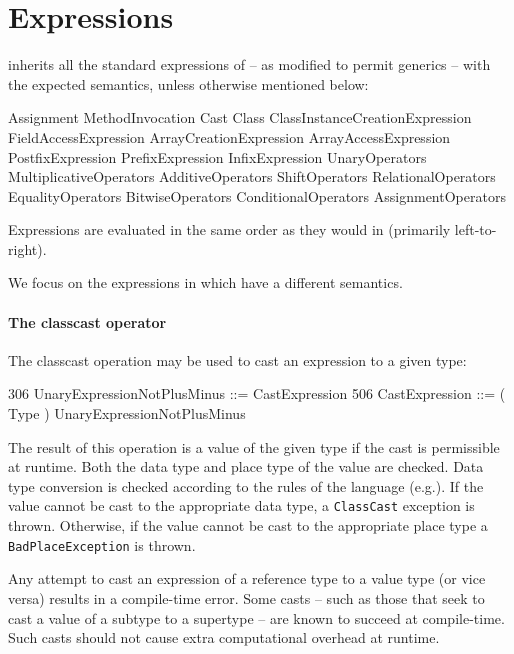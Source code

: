 \section{Expressions}\label{XtenExpressions}

{}\Xten{} inherits all the standard expressions of \Java{}
\cite[\S~15]{jls2} -- as modified to permit generics \cite{gjspec} --
with the expected semantics, unless otherwise mentioned below:

\begin{x10}
Assignment MethodInvocation 
Cast Class
ClassInstanceCreationExpression FieldAccessExpression   
ArrayCreationExpression ArrayAccessExpression
PostfixExpression PrefixExpression 
InfixExpression UnaryOperators
MultiplicativeOperators AdditiveOperators 
ShiftOperators RelationalOperators  
EqualityOperators BitwiseOperators
ConditionalOperators AssignmentOperators
\end{x10}

Expressions are evaluated in the same order as they would in \java{}
(primarily
left-to-right).\label{FieldAccess}\label{ClassCreation}\label{MethodInvocation}

We focus on the expressions in \Xten{} which have a different
semantics.

\paragraph{The classcast operator}\label{ClassCast}
The classcast operation may be used to cast an expression to a given type:
\begin{x10}
306 UnaryExpressionNotPlusMinus ::= 
      CastExpression
506 CastExpression ::= 
      ( Type ) UnaryExpressionNotPlusMinus
\end{x10}

The result of this operation is a value of the given type if the cast
is permissible at runtime. Both the data type and place type of the
value are checked. Data type conversion is checked according to the
rules of the \java{} language (e.g.{}\cite[\S 5.5]{jls2}). If the
value cannot be cast to the appropriate data type, a {\tt ClassCast}
exception is thrown. Otherwise, if the value cannot be cast to the
appropriate place type a {\tt BadPlaceException} is thrown. 

Any attempt to cast an expression of a reference type to a value type
(or vice versa) results in a compile-time error. Some casts -- such as
those that seek to cast a value of a subtype to a supertype -- are
known to succeed at compile-time. Such casts should not cause extra
computational overhead at runtime.

